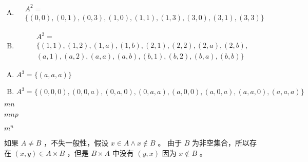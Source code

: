 {{        %
        \begin{practices}
            \begin{enumerate}[A.]
                \item
                {
                    \begin{align*}
                        &A^2 = \\
                        &\{(0, 0), (0, 1), (0, 3), (1, 0), (1, 1), (1, 3), (3, 0), (3, 1), (3, 3)\}
                    \end{align*}
                }
                \item
                {
                    \begin{align*}
                        &A^2 = \\
                        &\{(1, 1), (1, 2), (1, a), (1, b), (2, 1), (2, 2), (2, a), (2, b), \\
                        &(a, 1), (a, 2), (a, a), (a, b), (b, 1), (b, 2), (b, a), (b, b)\}
                    \end{align*}
                }
            \end{enumerate}
        \end{practices}

        \begin{practices}
            \begin{enumerate}[A.]
                \item $A^3 = \{(a, a, a)\}$
                \item $A^3 = \{(0, 0, 0), (0, 0, a), (0, a, 0), (0, a, a), (a, 0, 0), (a, 0, a), (a, a, 0), (a, a, a)\}$
            \end{enumerate}
        \end{practices}

        \begin{practices}
            $mn$
        \end{practices}

        \begin{practices}
            $mnp$
        \end{practices}

        \begin{practices}
            $m^n$
        \end{practices}

        \begin{practices}
            如果 $A \neq B$ ，不失一般性，假设 $x \in A \wedge x \notin B$ 。
            由于 $B$ 为非空集合，所以存在 $(x, y) \in A \times B$ ，但是 $B \times A$ 中没有 $(y, x)$ 因为 $x \notin B$ 。
        \end{practices}

}}
